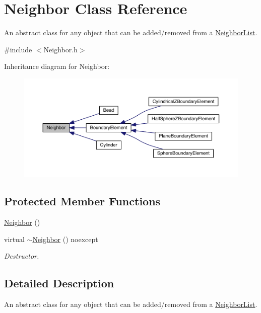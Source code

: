 \hypertarget{classNeighbor}{\section{Neighbor Class Reference}
\label{classNeighbor}
}


An abstract class for any object that can be added/removed from a \hyperlink{classNeighborList}{Neighbor\+List}.  




{\ttfamily \#include $<$Neighbor.\+h$>$}



Inheritance diagram for Neighbor\+:
\nopagebreak
\begin{figure}[H]
\begin{center}
\leavevmode
\includegraphics[width=350pt]{classNeighbor__inherit__graph}
\end{center}
\end{figure}
\subsection*{Protected Member Functions}
\begin{DoxyCompactItemize}
\item 
\hyperlink{classNeighbor_a179a8cd94aac70aeaf2bef17fa363ef5}{Neighbor} ()
\item 
virtual \hyperlink{classNeighbor_a6b5cbfb8ae7f168faac4081af62d74db}{$\sim$\+Neighbor} () noexcept
\begin{DoxyCompactList}\small\item\em Destructor. \end{DoxyCompactList}\end{DoxyCompactItemize}


\subsection{Detailed Description}
An abstract class for any object that can be added/removed from a \hyperlink{classNeighborList}{Neighbor\+List}. 

